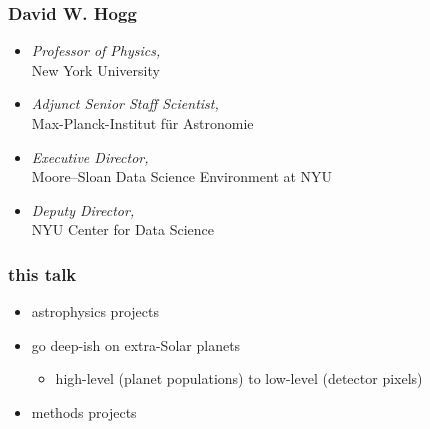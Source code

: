 \documentclass{beamer}
\begin{document}
\begin{frame}
  \frametitle{David W. Hogg}
  \begin{itemize}
  \item \textsl{Professor of Physics,}\\ New York University
  \item \textsl{Adjunct Senior Staff Scientist,}\\ Max-Planck-Institut f\"ur Astronomie
  \item \textsl{Executive Director,}\\ Moore--Sloan Data Science Environment at NYU
  \item \textsl{Deputy Director,}\\ NYU Center for Data Science
  \end{itemize}
\end{frame}

\begin{frame}
  \frametitle{this talk}
  \begin{itemize}
  \item astrophysics projects
  \item go deep-ish on extra-Solar planets
    \begin{itemize}
    \item high-level (planet populations) to low-level (detector pixels)
    \end{itemize}
  \item methods projects
  \end{itemize}
\end{frame}
\end{document}
